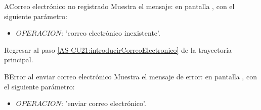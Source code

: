 
\begin{UCtrayectoriaA}{A}{Correo electrónico no registrado}
	\UCpaso Muestra el mensaje:  en pantalla 
	, con el siguiente parámetro:
	\begin{itemize}
		\item $OPERACION$: 'correo electrónico inexistente'.
	\end{itemize}
	
	
	\UCpaso Regresar al paso \ref{AS-CU21:introducirCorreoElectronico} de 
	la trayectoria principal.
\end{UCtrayectoriaA}


\begin{UCtrayectoriaA}{B}{Error al enviar correo electrónico}
	\UCpaso Muestra el mensaje de error:  en pantalla 
	, con el siguiente parámetro:
	\begin{itemize}
		\item $OPERACION$: 'enviar correo electrónico'.
	\end{itemize}
	
\end{UCtrayectoriaA}

